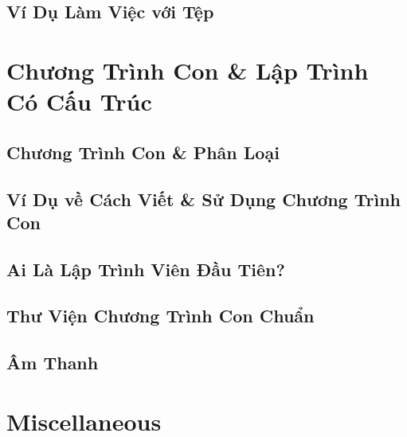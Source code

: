\documentclass[oneside]{book}
\numberwithin{equation}{section}
\begin{document}
\section{Ví Dụ Làm Việc với Tệp}


\chapter{Chương Trình Con \& Lập Trình Có Cấu Trúc}

\section{Chương Trình Con \& Phân Loại}


\section{Ví Dụ về Cách Viết \& Sử Dụng Chương Trình Con}


\section{Ai Là Lập Trình Viên Đầu Tiên?}


\section{Thư Viện Chương Trình Con Chuẩn}


\section{Âm Thanh}


\appendix

\chapter{Miscellaneous}
\end{document}
